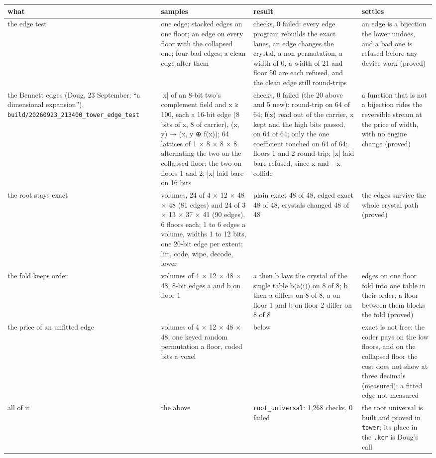 {\footnotesize
\setlength{\tabcolsep}{6pt}
\begin{longtable}{>{\RaggedRight\arraybackslash}p{}>{\RaggedRight\arraybackslash}p{}>{\RaggedRight\arraybackslash}p{}>{\RaggedRight\arraybackslash}p{}}
\toprule
what & samples & result & settles \\
\midrule
\endhead
the edge test & one edge; stacked edges on one floor; an edge on every floor with the collapsed one; four bad edges; a clean edge after them & 20 checks, 0 failed: every edge program rebuilds the exact lanes, an edge changes the crystal, a non-permutation, a width of 0, a width of 21 and floor 50 are each refused, and the clean edge still round-trips & an edge is a bijection the lower undoes, and a bad one is refused before any device work (proved) \\
the Bennett edges (Doug, 23 September: “a dimensional expansion”), \texttt{build/\allowbreak{}20260923\_\allowbreak{}213400\_\allowbreak{}tower\_\allowbreak{}edge\_\allowbreak{}test} & |x| of an 8-bit two's complement field and x ≥ 100, each a 16-bit edge (8 bits of x, 8 of carrier), (x, y) → (x, y ⊕ f(x)); 64 lattices of 1 × 8 × 8 × 8 alternating the two on the collapsed floor; the two on floors 1 and 2; |x| laid bare on 16 bits & 25 checks, 0 failed (the 20 above and 5 new): round-trip on 64 of 64; f(x) read out of the carrier, x kept and the high bits passed, on 64 of 64; only the one coefficient touched on 64 of 64; floors 1 and 2 round-trip; |x| laid bare refused, since x and −x collide & a function that is not a bijection rides the reversible stream at the price of width, with no engine change (proved) \\
the root stays exact & 48 volumes, 24 of 4 × 12 × 48 × 48 (81 edges) and 24 of 3 × 13 × 37 × 41 (90 edges), 6 floors each; 1 to 6 edges a volume, widths 1 to 12 bits, one 20-bit edge per extent; lift, code, wipe, decode, lower & plain exact 48 of 48, edged exact 48 of 48, crystals changed 48 of 48 & the edges survive the whole crystal path (proved) \\
the fold keeps order & 8 volumes of 4 × 12 × 48 × 48, 8-bit edges a and b on floor 1 & a then b lays the crystal of the single table b(a(i)) on 8 of 8; b then a differs on 8 of 8; a on floor 1 and b on floor 2 differ on 8 of 8 & edges on one floor fold into one table in their order; a floor between them blocks the fold (proved) \\
the price of an unfitted edge & 8 volumes of 4 × 12 × 48 × 48, one keyed random permutation a floor, coded bits a voxel & below & exact is not free: the coder pays on the low floors, and on the collapsed floor the cost does not show at three decimals (measured); a fitted edge not measured \\
all of it & the above & \texttt{root\_\allowbreak{}universal}: 1,268 checks, 0 failed & the root universal is built and proved in \texttt{tower}; its place in the \texttt{.\allowbreak{}kcr} is Doug's call \\
\bottomrule
\end{longtable}
}


